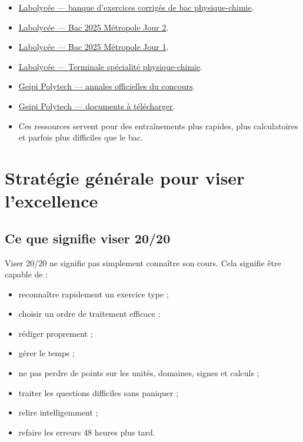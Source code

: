\documentclass[11pt,a4paper]{article}
\begin{document}
\begin{sujetofficiel}
\begin{itemize}
  \item \href{https://www.labolycee.org/}{Labolycée — banque d'exercices corrigés de bac physique-chimie}.
  \item \href{https://www.labolycee.org/bac-2025-metropole-jour-2}{Labolycée — Bac 2025 Métropole Jour 2}.
  \item \href{https://labolycee.org/bac-2025-metropole-jour-1}{Labolycée — Bac 2025 Métropole Jour 1}.
  \item \href{https://www.labolycee.org/tale-specialite-physique-chimie?page=2}{Labolycée — Terminale spécialité physique-chimie}.
\end{itemize}
\end{sujetofficiel}

\begin{sujetofficiel}
\begin{itemize}
  \item \href{https://www.geipi-polytech.org/annales-du-concours-geipi-polytech/}{Geipi Polytech — annales officielles du concours}.
  \item \href{https://www.geipi-polytech.org/telechargement/}{Geipi Polytech — documents à télécharger}.
  \item Ces ressources servent pour des entraînements plus rapides, plus calculatoires et parfois plus difficiles que le bac.
\end{itemize}
\end{sujetofficiel}

\section{Stratégie générale pour viser l'excellence}

\subsection{Ce que signifie viser 20/20}

Viser 20/20 ne signifie pas simplement connaître son cours. Cela signifie être capable de :
\begin{itemize}
  \item reconnaître rapidement un exercice type ;
  \item choisir un ordre de traitement efficace ;
  \item rédiger proprement ;
  \item gérer le temps ;
  \item ne pas perdre de points sur les unités, domaines, signes et calculs ;
  \item traiter les questions difficiles sans paniquer ;
  \item relire intelligemment ;
  \item refaire les erreurs 48 heures plus tard.
\end{itemize}
\end{document}
